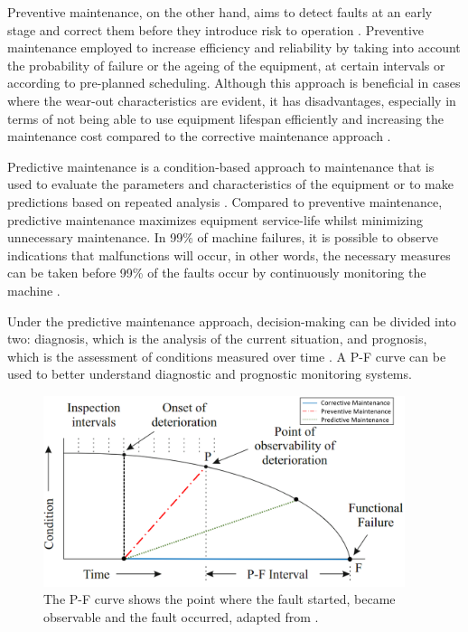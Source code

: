 Preventive maintenance, on the other hand, aims to detect faults at an early stage and correct them before they introduce risk to operation \cite{en201713306}. Preventive maintenance employed to increase efficiency and reliability by taking into account the probability of failure or the ageing of the equipment, at certain intervals or according to pre-planned scheduling. Although this approach is beneficial in cases where the wear-out characteristics are evident, it has disadvantages, especially in terms of not being able to use equipment lifespan efficiently and increasing the maintenance cost compared to the corrective maintenance approach \cite{AHMAD}.

Predictive maintenance is a condition-based approach to maintenance that is used to evaluate the parameters and characteristics of the equipment or to make predictions based on repeated analysis \cite{en201713306}. Compared to preventive maintenance, predictive maintenance maximizes equipment service-life whilst minimizing unnecessary maintenance. In 99\% of machine failures, it is possible to observe indications that malfunctions will occur, in other words, the necessary measures can be taken before 99\% of the faults occur by continuously monitoring the machine \cite{AHMAD}.

Under the predictive maintenance approach, decision-making can be divided into two: diagnosis, which is the analysis of the current situation, and prognosis, which is the assessment of conditions measured over time \cite{tinga2019physical}. A P-F curve can be used to better understand diagnostic and prognostic monitoring systems.

\begin{figure}[h]
	\centering
	\includegraphics[width=300pt,keepaspectratio=true]{./fig/PFdiagram.png}
	\caption{The P-F curve shows the point where the fault started, became observable and the fault occurred, adapted from \cite{tinga2019physical}.}	
	\label{PF_diagram}
\end{figure}

